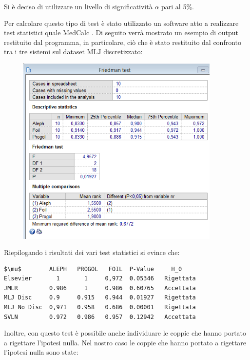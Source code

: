 Si è deciso di utilizzare un livello di significatività $\alpha$ pari al 5\%.

Per calcolare questo tipo di test è stato utilizzato un software atto a realizzare test statistici quale MedCalc \textcopyright.
Di seguito verrà mostrato un esempio di output restituito dal programma, in particolare, ciò che è stato restituito dal confronto tra i tre sistemi sul dataset MLJ discretizzato:
\begin{figure}[H]
	\includegraphics[width=0.9\textwidth]{img/TestResult/mljdiscr.png}
	\label{Friedman Test - MLJ Discretizzato}
\end{figure}

Riepilogando i risultati dei vari test statistici si evince che:
\begin{lstlisting}
$\mu$        ALEPH   PROGOL   FOIL  P-Value     H_0  
Elsevier       1       1     0,972  0.05346   Rigettata
JMLR         0.986     1     0.986  0.60765   Accettata
MLJ Disc     0.9     0.915   0.944  0.01927   Rigettata
MLJ No Disc  0,971   0.958   0.686  0.00001   Rigettata
SVLN         0.972   0.986   0.957  0.12942   Accettata
\end{lstlisting}

Inoltre, con questo test è possibile anche individuare le coppie che hanno portato a rigettare l'ipotesi nulla. Nel nostro caso le coppie che hanno portato a rigettare l'ipotesi nulla sono state:

